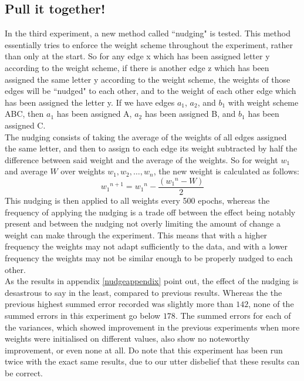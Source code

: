\documentclass[a4paper, 10pt, notitlepage, twocolumn]{article}
\begin{document}
  \subsection{Pull it together!}
  In the third experiment, a new method called ``nudging" is tested. This method essentially tries to enforce the weight scheme throughout the experiment, rather than only at the start. So for any edge x which has been assigned letter y according to the weight scheme, if there is another edge z which has been assigned the same letter y according to the weight scheme, the weights of those edges will be ``nudged" to each other, and to the weight of each other edge which has been assigned the letter y. If we have edges $a_1$, $a_2$, and $b_1$ with weight scheme ABC, then $a_1$ has been assigned A, $a_2$ has been assigned B, and $b_1$ has been assigned C. \\
  The nudging consists of taking the average of the weights of all edges assigned the same letter, and then to assign to each edge its weight subtracted by half the difference between said weight and the average of the weights. So for weight $w_1$ and average $W$ over weights $w_1, w_2, \ldots, w_n$, the new weight is calculated as follows: 
  $${w_1}^{n + 1} = {w_1}^n - \frac{({w_1}^n - W)}{2}$$
  This nudging is then applied to all weights every 500 epochs, whereas the frequency of applying the nudging is a trade off between the effect being notably present and between the nudging not overly limiting the amount of change a weight can make through the experiment. This means that with a higher frequency the weights may not adapt sufficiently to the data, and with a lower frequency the weights may not be similar enough to be properly nudged to each other.\\
  As the results in appendix \ref{nudgeappendix} point out, the effect of the nudging is desastrous to say in the least, compared to previous results. Whereas the the previous highest summed error recorded was slightly more than $142$, none of the summed errors in this experiment go below $178$. The summed errors for each of the variances, which showed improvement in the previous experiments when more weights were initialised on different values, also show no noteworthy improvement, or even none at all. Do note that this experiment has been run twice with the exact same results, due to our utter disbelief that these results can be correct.
  
\end{document}
